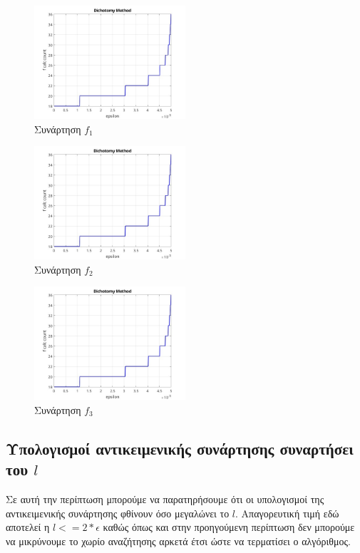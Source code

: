 \begin{figure}[H] %
    \centering
    \includegraphics[width=0.5\textwidth]{media/dichotomyf1_1} %
    \caption{Συνάρτηση $f_1$}
\end{figure}

\begin{figure}[H] %
    \centering
    \includegraphics[width=0.5\textwidth]{media/dichotomyf2_1} %
    \caption{Συνάρτηση $f_2$}
\end{figure}

\begin{figure}[H] %
    \centering
    \includegraphics[width=0.5\textwidth]{media/dichotomyf3_1} %
    \caption{Συνάρτηση $f_3$}
\end{figure}

\subsection{Υπολογισμοί αντικειμενικής συνάρτησης συναρτήσει του $l$}
Σε αυτή την περίπτωση μπορούμε να παρατηρήσουμε ότι οι υπολογισμοί της αντικειμενικής συνάρτησης
φθίνουν όσο μεγαλώνει το $l$. Απαγορευτική τιμή εδώ αποτελεί η $l <= 2*\epsilon$ καθώς
όπως και στην προηγούμενη περίπτωση δεν μπορούμε να μικρύνουμε το χωρίο αναζήτησης αρκετά έτσι ώστε να 
τερματίσει ο αλγόριθμος.

